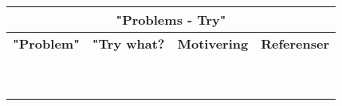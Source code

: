 \begin{table}[htbp]
\begin{center}
\begin{tabular}{|c|c|c|c|}
\hline
\multicolumn{4}{|c|}{\cellcolor{grey}\textbf{"Problems - Try"}}\\
\hline \rowcolor{grey}
\textbf{"Problem"}                      & \textbf{"Try what?}      & \textbf{Motivering} & \textbf{Referenser} \\
\hline
                                        &                          &                     & \\
                                        &                          &                     & \\
\hline
                                        &                          &                     & \\
                                        &                          &                     & \\
\hline
                                        &                          &                     & \\
\hline
                                        &                          &                     & \\
\hline
                                        &                          &                     & \\
\hline
                                        &                          &                     & \\
\hline

\multicolumn{4}{c}{}\\


\end{tabular}
\end{center}
\end{table}
